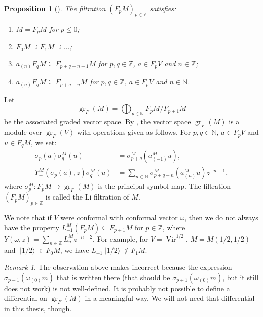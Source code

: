 \documentclass[a4paper, 12pt, reqno]{amsart}
\newtheorem{proposition}[theorem]{Proposition}
\theoremstyle{remark}
\newtheorem{remark}[theorem]{Remark}
\DeclareMathOperator{\Vir}{Vir}
\DeclareMathOperator{\gr}{gr}
\DeclareMathOperator{\vachalf}{|1/2\rangle}
\begin{document}
\begin{proposition}[{\cite{li_abelianizing_2005}}]
  \label{prp:16}
  The filtration $(F_pM)_{p \in \mathbb{Z}}$ satisfies:
  \begin{enumerate}
  \item $M = F_pM$ for $p \le 0$;
  \item $F_0M \supseteq F_1M \supseteq \dots$;
  \item $a_{(n)}F_qM \subseteq F_{p + q - n - 1}M$ for $p, q \in \mathbb{Z}$, $a \in F_pV$ and $n \in \mathbb{Z}$;
  \item $a_{(n)}F_qM \subseteq F_{p + q - n}M$ for $p, q \in \mathbb{Z}$, $a \in F_pV$ and $n \in \mathbb{N}$.
  \end{enumerate}
\end{proposition}

Let
\begin{equation*}
  \gr_F(M) = \bigoplus_{p \in \mathbb{N}}F_pM/F_{p + 1}M
\end{equation*}
be the associated graded vector space.
By \cite{li_abelianizing_2005}, the vector space $\gr_F(M)$ is a module over $\gr_F(V)$ with operations given as follows.
For $p, q \in \mathbb{N}$, $a \in F_pV$ and $u \in F_qM$, we set:
\begin{align*}
  \sigma_p(a)\sigma^M_q(u) &= \sigma^M_{p + q}(a^M_{(-1)}u), \\
  Y^M_-(\sigma_p(a), z)\sigma^M_q(u) &= \sum_{n \in \mathbb{N}}\sigma^M_{p + q - n}(a^M_{(n)}u)z^{-n - 1},
\end{align*}
where $\sigma^M_p: F_pM \to \gr_F(M)$ is the principal symbol map.
The filtration $(F_pM)_{p \in \mathbb{Z}}$ is called the Li filtration of $M$.

We note that if $V$ were conformal with conformal vector $\omega$, then we do not always have the property $L_{-1}^M(F_pM) \subseteq F_{p + 1}M$ for $p \in \mathbb{Z}$, where $Y(\omega, z) = \sum_{n \in \mathbb{Z}}L^M_nz^{-n - 2}$.
For example, for $V = \Vir^{1/2}$, $M = M(1/2, 1/2)$ and $\vachalf \in F_0M$, we have $L_{-1}\vachalf \notin F_1M$.

\begin{remark}
  \label{rmk:41}
  The observation above makes \cite[Lemma 3.1.2]{arakawa_remark_2012} incorrect because the expression $\sigma_{p - 1}(\omega_{(0)}m)$ that is written there (that should be $\sigma_{p + 1}(\omega_{(0)}m)$, but it still does not work) is not well-defined.
  It is probably not possible to define a differential on $\gr_F(M)$ in a meaningful way.
  We will not need that differential in this thesis, though.
\end{remark}
\end{document}
